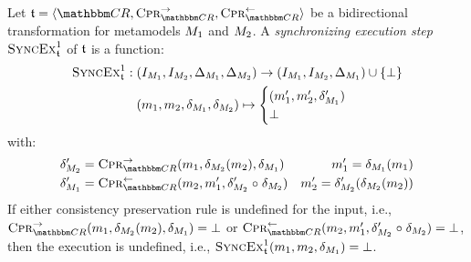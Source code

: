 \begin{definition}
    \label{def:synchronizingtransformationexecutionstep}
    Let $\transformation{t} = \tupled{\consistencyrelationset{CR}, \consistencypreservationrule{\consistencyrelationset{CR}}^{\rightarrow}, \consistencypreservationrule{\consistencyrelationset{CR}}^{\leftarrow}}$ be a bidirectional transformation for metamodels $M_{1}$ and $M_{2}$.
    A \emph{synchronizing execution step} $\textsc{SyncEx}_{\mathfrak{t}}^1$ of $\mathfrak{t}$ is a function:
    \begin{align*}
        \textsc{SyncEx}_{\mathfrak{t}}^1 : \; & (I_{M_{1}}, I_{M_{2}}, \Delta_{M_{1}}, \Delta_{M_{2}}) \rightarrow (I_{M_{1}}, I_{M_{2}}, \Delta_{M_{1}}) \cup \{ \bot \} \\
        & (m_{1}, m_{2}, \delta_{M_{1}}, \delta_{M_{2}}) \mapsto 
        \begin{cases} 
            (m_{1}', m_{2}', \delta_{M_{1}}') \\
            \bot
        \end{cases}
    \end{align*}
    with:
    \begin{align*}
        & \change{\metamodel{M}{2}}' = \consistencypreservationrule{\consistencyrelationset{CR}}^{\rightarrow}(\model{m}{1}, \change{\metamodel{M}{2}}(\model{m}{2}), \change{\metamodel{M}{1}}) %
        & \model{m}{1}' = \change{\metamodel{M}{1}}(\model{m}{1}) \\
        & \change{\metamodel{M}{1}}' = \consistencypreservationrule{\consistencyrelationset{CR}}^{\leftarrow}(\model{m}{2}, \model{m}{1}', \change{\metamodel{M}{2}}' \concatfunction \change{\metamodel{M}{2}}) %
        & \model{m}{2}' = \change{\metamodel{M}{2}}'(\change{\metamodel{M}{2}}(\model{m}{2}))
    \end{align*}
    If either consistency preservation rule is undefined for the input, i.e., $\consistencypreservationrule{\consistencyrelationset{CR}}^{\rightarrow}(\model{m}{1}, \change{\metamodel{M}{2}}(\model{m}{2}), \change{\metamodel{M}{1}}) = \bot$ or $\consistencypreservationrule{\consistencyrelationset{CR}}^{\leftarrow}(\model{m}{2}, \model{m}{1}', \change{\metamodel{M}{2}}' \concatfunction \change{\metamodel{M}{2}}) = \bot$, then the execution is undefined, i.e., $\textsc{SyncEx}_{\mathfrak{t}}^1(m_{1}, m_{2}, \delta_{M_{1}}) = \bot$.

\end{definition}
